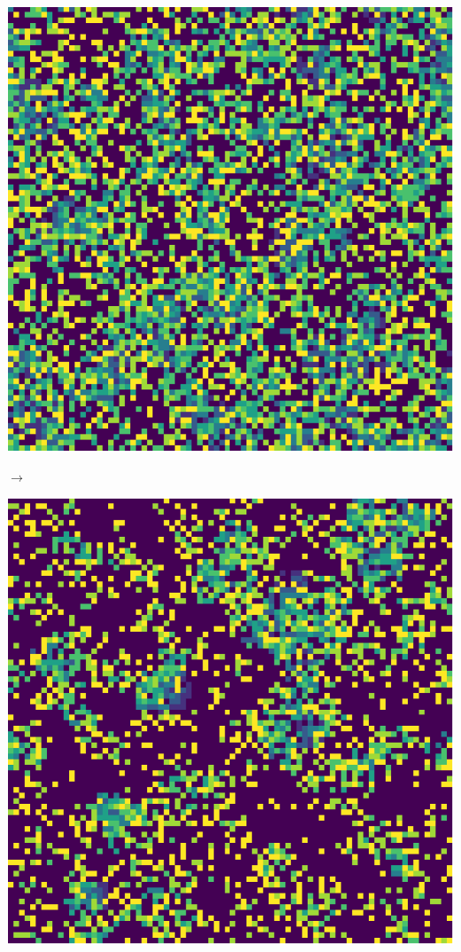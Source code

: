 \documentclass[12pt, a4paper]{article}
\begin{document}
\begin{center}
\begin{minipage}{.17\linewidth}
                \includegraphics[scale=0.15]{img/part2/step2.png}
            \end{minipage}
            $\rightarrow$
            \begin{minipage}{.17\linewidth}
                \includegraphics[scale=0.15]{img/part2/step3.png}

\end{minipage}
\end{center}
\end{document}
